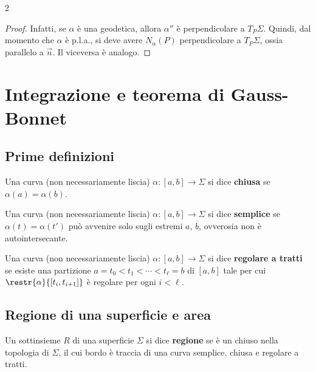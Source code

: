 \begin{multicols*}{2}
    \begin{proof}
        Infatti, se $\alpha$ è una geodetica, allora $\alpha''$ è perpendicolare a
        $T_P \Sigma$. Quindi, dal momento che $\alpha$ è p.l.a., si deve avere
        $N_\alpha(P)$ perpendicolare a $T_P \Sigma$, ossia parallelo
        a $\vec{n}$. Il viceversa è analogo.
    \end{proof}

    \section{Integrazione e teorema di Gauss-Bonnet}

    \subsection{Prime definizioni}

    \begin{definition}
        Una curva (non necessariamente liscia) $\alpha : [a, b] \to \Sigma$ si dice
        \textbf{chiusa} se $\alpha(a) = \alpha(b)$.
    \end{definition}

    \begin{definition}
        Una curva (non necessariamente liscia) $\alpha : [a, b] \to \Sigma$ si dice
        \textbf{semplice} se $\alpha(t) = \alpha(t')$ può avvenire solo
        sugli estremi $a$, $b$, ovverosia non è autointersecante.
    \end{definition}

    \begin{definition}
        Una curva (non necessariamente liscia) $\alpha : [a, b] \to \Sigma$ si dice
        \textbf{regolare a tratti} se esiste una partizione $a = t_0 < t_1 < \cdots < t_\ell = b$
        di $[a, b]$ tale per cui $\restr{\alpha}{[t_i, t_{i+1}]}$ è regolare per ogni
        $i < \ell$.
    \end{definition}

    \subsection{Regione di una superficie e area}

    \begin{definition}[Regione]
        Un sottinsieme $R$ di una superficie $\Sigma$ si dice \textbf{regione} se
        è un chiuso nella topologia di $\Sigma$, il cui bordo è traccia di una
        curva semplice, chiusa e regolare a tratti.
    \end{definition}


\end{multicols*}
